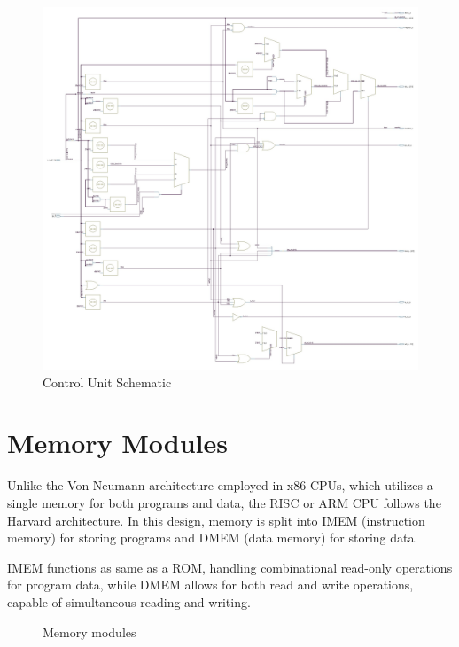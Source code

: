 \documentclass[12pt,a4paper,oneside]{book} %
\begin{document}
\begin{figure}[H]
    \centering
    \includegraphics[width=.9\textwidth]{images/ctrl_logic.jpg}
    \caption{Control Unit Schematic\protect\footnotemark}
\end{figure}

\section{Memory Modules}
Unlike the Von Neumann architecture employed in x86 CPUs, which utilizes a single memory for both programs and data, the RISC or ARM CPU follows the Harvard architecture. In this design, memory is split into IMEM (instruction memory) for storing programs and DMEM (data memory) for storing data.

IMEM functions as same as a ROM, handling combinational read-only operations for program data, while DMEM allows for both read and write operations, capable of simultaneous reading and writing.

\begin{figure}[H]
    \centering
    \caption{Memory modules}
\end{figure}
\end{document}
